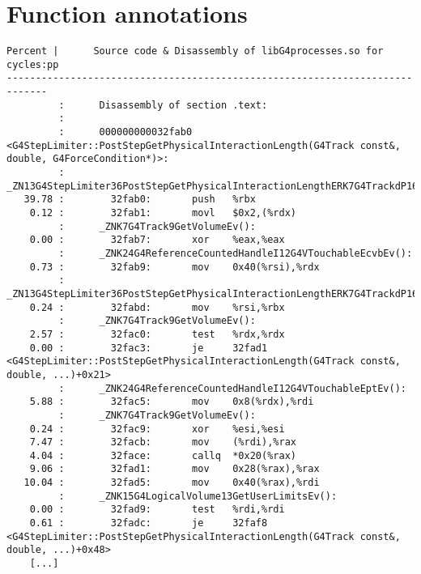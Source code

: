 \documentclass[a4paper]{jpconf}
\begin{document}
\newpage
\newpage
\begin{appendices}
\label{appendix:function-recordings}
\section{Function annotations}
\begin{minipage}{\linewidth}
\begin{lstlisting}[language={[x64]Assembler}, basicstyle=\ttfamily\tiny,
caption=G4StepLimiter::PostStepGetPhysicalInteractionLength cycles annotation]
Percent |      Source code & Disassembly of libG4processes.so for  cycles:pp
-----------------------------------------------------------------------------
         :      Disassembly of section .text:
         :
         :      000000000032fab0 <G4StepLimiter::PostStepGetPhysicalInteractionLength(G4Track const&, double, G4ForceCondition*)>:
         :      _ZN13G4StepLimiter36PostStepGetPhysicalInteractionLengthERK7G4TrackdP16G4ForceCondition():
   39.78 :        32fab0:       push   %rbx
    0.12 :        32fab1:       movl   $0x2,(%rdx)
         :      _ZNK7G4Track9GetVolumeEv():
    0.00 :        32fab7:       xor    %eax,%eax
         :      _ZNK24G4ReferenceCountedHandleI12G4VTouchableEcvbEv():
    0.73 :        32fab9:       mov    0x40(%rsi),%rdx
         :      _ZN13G4StepLimiter36PostStepGetPhysicalInteractionLengthERK7G4TrackdP16G4ForceCondition():
    0.24 :        32fabd:       mov    %rsi,%rbx
         :      _ZNK7G4Track9GetVolumeEv():
    2.57 :        32fac0:       test   %rdx,%rdx
    0.00 :        32fac3:       je     32fad1 <G4StepLimiter::PostStepGetPhysicalInteractionLength(G4Track const&, double, ...)+0x21>
         :      _ZNK24G4ReferenceCountedHandleI12G4VTouchableEptEv():
    5.88 :        32fac5:       mov    0x8(%rdx),%rdi
         :      _ZNK7G4Track9GetVolumeEv():
    0.24 :        32fac9:       xor    %esi,%esi
    7.47 :        32facb:       mov    (%rdi),%rax
    4.04 :        32face:       callq  *0x20(%rax)
    9.06 :        32fad1:       mov    0x28(%rax),%rax
   10.04 :        32fad5:       mov    0x40(%rax),%rdi
         :      _ZNK15G4LogicalVolume13GetUserLimitsEv():
    0.00 :        32fad9:       test   %rdi,%rdi
    0.61 :        32fadc:       je     32faf8 <G4StepLimiter::PostStepGetPhysicalInteractionLength(G4Track const&, double, ...)+0x48>
    [...]
\end{lstlisting}
\end{minipage}


\end{appendices}
\end{document}
